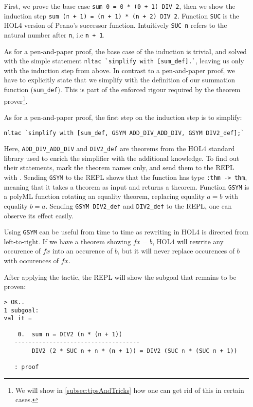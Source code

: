 First, we prove the base case \lstinline{sum 0 = 0 * (0 + 1) DIV 2}, then we
show the induction step \lstinline{sum (n + 1) = (n + 1) * (n + 2) DIV 2}.
Function \lstinline{SUC} is the HOL4 version of Peano's successor function.
Intuitively \lstinline{SUC n} refers to the natural number after \lstinline{n},
i.e \lstinline{n + 1}.

As for a pen-and-paper proof, the base case of the induction is trivial, and
solved with the simple statement \lstinline{nltac `simplify with [sum_def].`},
leaving us only with the induction step from above.
In contrast to a pen-and-paper proof, we have to explicitly state that we
simplify with the definition of our summation function (\lstinline{sum_def}).
This is part of the enforced rigour required by the theorem prover\footnote{
We will show in \autoref{subsec:tipsAndTricks} how one can get rid of this in certain cases.}.

As for a pen-and-paper proof, the first step on the induction step is to
simplify:
\begin{lstlisting}
nltac `simplify with [sum_def, GSYM ADD_DIV_ADD_DIV, GSYM DIV2_def];`
\end{lstlisting}

Here, \lstinline{ADD_DIV_ADD_DIV} and \lstinline{DIV2_def} are theorems from the
HOL4 standard library used to enrich the simplifier with the additional
knowledge.
To find out their statements, mark the theorem names only, and send them to the
REPL with .
Sending \lstinline{GSYM} to the REPL shows that the function has type
\lstinline{:thm -> thm}, meaning that it takes a theorem as input and returns a
theorem.
Function \lstinline{GSYM} is a polyML function rotating an equality theorem,
replacing equality $a = b$ with equality $b = a$.
Sending \lstinline{GSYM DIV2_def} and \lstinline{DIV2_def} to the REPL, one can
observe its effect easily.

Using \lstinline{GSYM} can be useful from time to time as rewriting in HOL4 is
directed from left-to-right.
If we have a theorem showing $f x = b$, HOL4 will rewrite any occurence of
$f x$ into an occurence of $b$, but it will never replace occurences of $b$
with occurences of $f x$.

After applying the tactic, the REPL will show the subgoal that remains to be proven:
\begin{lstlisting}
> OK..
1 subgoal:
val it =

    0.  sum n = DIV2 (n * (n + 1))
   ------------------------------------
        DIV2 (2 * SUC n + n * (n + 1)) = DIV2 (SUC n * (SUC n + 1))

   : proof
\end{lstlisting}

